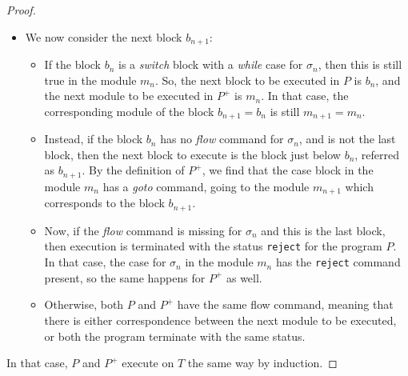 \begin{appendices}
\begin{proof}
\begin{itemize}
\begin{itemize}
            \item We now consider the next block $b_{n+1}$:
            \begin{itemize}
                \item If the block $b_n$ is a \textit{switch} block with a \textit{while} case for $\sigma_n$, then this is still true in the module $m_n$. So, the next block to be executed in $P$ is $b_n$, and the next module to be executed in $P^+$ is $m_n$. In that case, the corresponding module of the block $b_{n+1} = b_n$ is still $m_{n+1} = m_n$.
    
                \item Instead, if the block $b_n$ has no \textit{flow} command for $\sigma_n$, and is not the last block, then the next block to execute is the block just below $b_n$, referred as $b_{n+1}$. By the definition of $P^+$, we find that the case block in the module $m_n$ has a \textit{goto} command, going to the module $m_{n+1}$ which corresponds to the block $b_{n+1}$. 
            
                \item Now, if the \textit{flow} command is missing for $\sigma_n$ and this is the last block, then execution is terminated with the status \texttt{reject} for the program $P$. In that case, the case for $\sigma_n$ in the module $m_n$ has the \texttt{reject} command present, so the same happens for $P^+$ as well. 
            
                \item Otherwise, both $P$ and $P^+$ have the same flow command, meaning that there is either correspondence between the next module to be executed, or both the program terminate with the same status. 
            \end{itemize}
        \end{itemize}
    \end{itemize}
    In that case, $P$ and $P^+$ execute on $T$ the same way by induction.
\end{proof}


\end{appendices}
